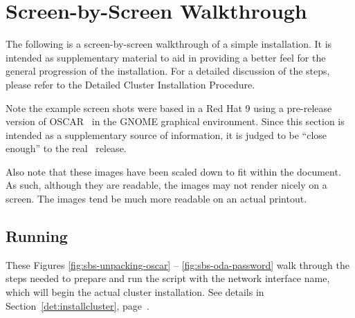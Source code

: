 %
% 
%
%
%


\newpage

\section{Screen-by-Screen Walkthrough}
\label{app:screen-by-screen}

The following is a screen-by-screen walkthrough of a simple installation.
It is intended as supplementary material to aid in providing a better feel
for the general progression of the installation.  For a detailed discussion
of the steps, please refer to the Detailed Cluster Installation Procedure. 

Note the example screen shots were based in a Red Hat 9 using a
pre-release version of OSCAR \oscarversion\ in the GNOME graphical
environment.  Since this section is intended as a supplementary source
of information, it is judged to be ``close enough'' to the real
\oscarversion\ release.  

Also note that these images have been scaled down to fit within the
document.  As such, although they are readable, the images may not
render nicely on a screen.  The images tend be much more readable on
an actual printout.



\subsection{Running }


These Figures \ref{fig:sbs-unpacking-oscar} -- \ref{fig:sbs-oda-password}
walk through the steps needed to prepare and run the 
script with the network interface name, which will begin the actual cluster
installation.  See details in Section~\ref{det:installcluster},
page~\pageref{det:installcluster}.

